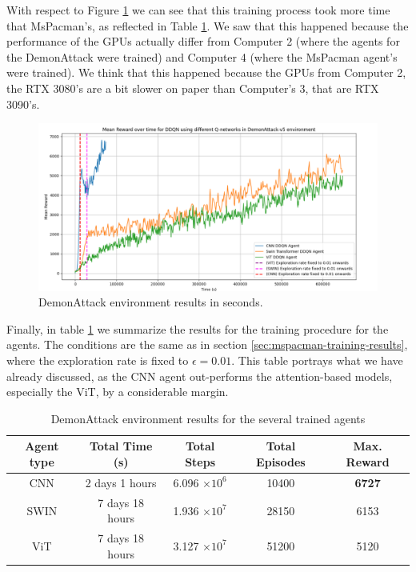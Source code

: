 With respect to Figure \ref{fig:demonattackresultsseconds} we can see that this training process took more time that MsPacman's, as reflected in Table \ref{tab:demonattack_trainingresults}. We saw that this happened because the performance of the GPUs actually differ from Computer 2 (where the agents for the DemonAttack were trained) and Computer 4 (where the MsPacman agent's were trained). We think that this happened because the GPUs from Computer 2, the RTX 3080's are a bit slower on paper than Computer's 3, that are RTX 3090's.

\begin{figure}[!h]
	\centering
	\includegraphics[width=\linewidth]{figures/demon_attack_results_seconds}
	\caption{DemonAttack environment results in seconds.}
	\label{fig:demonattackresultsseconds}
\end{figure}

Finally, in table \ref{tab:demonattack_trainingresults} we summarize the results for the training procedure for the agents. The conditions are the same as in section \ref{sec:mspacman-training-results}, where the exploration rate is fixed to $\epsilon = 0.01$. This table portrays what we have already discussed, as the CNN agent out-performs the attention-based models, especially the ViT, by a considerable margin.

\begin{table}[!h]
	\begin{center}
		\caption[MsPacman environment results for the several trained agents]{DemonAttack environment results for the several trained agents}
		\label{tab:demonattack_trainingresults}
		\begin{tabular}{||c c c c | c||} 
			\hline
			Agent type & Total Time (s) & Total Steps & Total Episodes & Max. Reward \\ [0.5ex] 
			\hline\hline
			CNN & 2 days 1 hours& 6.096 $\times 10^6$ & 10400 &  \textbf{6727}\\ 
			\hline
			SWIN & 7 days 18 hours & 1.936 $\times 10^7$ &  28150 & 6153 \\
			\hline
			ViT & 7 days 18 hours & 3.127 $\times 10^7$ &  51200 & 5120 \\
			\hline
		\end{tabular}
	\end{center}
\end{table}



